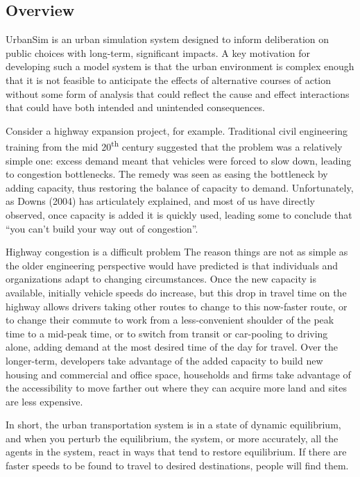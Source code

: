 \subsection{Overview}

UrbanSim is an urban simulation system designed to inform deliberation on public choices with long-term, significant impacts. A key motivation for developing such a model system is that the urban environment
is complex enough that it is not feasible to anticipate the effects of alternative courses of action without some form of analysis that could reflect the cause and effect interactions that could have both intended and unintended consequences.

Consider a highway expansion project, for example. Traditional civil engineering training from the mid 20\textsuperscript{th} century suggested that the problem was a relatively simple one: excess demand meant that vehicles were forced to slow down, leading to congestion bottlenecks. The remedy was seen as easing the bottleneck by adding capacity, thus restoring the balance of capacity to demand. Unfortunately, as Downs (2004) has articulately explained, and most of us have directly observed, once capacity is added it is quickly used, leading some to conclude that \enquote{you can't build your way out of congestion}.

Highway congestion is a difficult problem The reason things are not as simple as the older engineering perspective would have predicted is that individuals and organizations adapt to changing circumstances. Once the new capacity is available, initially vehicle speeds do increase, but this drop in travel time on the highway allows drivers taking other routes to change to this now-faster route, or to change their commute to work from a less-convenient shoulder of the peak time to a mid-peak time, or to switch from transit or car-pooling to driving alone, adding demand at the most desired time of the day for travel. Over the longer-term, developers take advantage of the added capacity to build new housing and commercial and office space, households and firms take advantage of the accessibility to move farther out where they can acquire more land and sites are less expensive.

In short, the urban transportation system is in a state of dynamic equilibrium, and when you perturb the equilibrium, the system, or more accurately, all the agents in the system, react in ways that tend to restore equilibrium. If there are faster speeds to be found to travel to desired destinations, people will find them.

